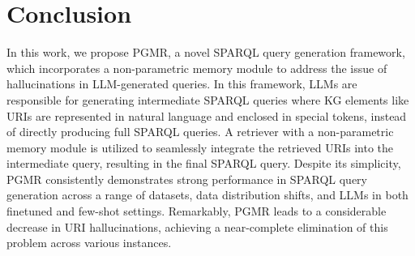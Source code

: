 \section{Conclusion}
\label{sec:conclusion}

In this work, we propose PGMR, a novel SPARQL query generation framework, which incorporates a non-parametric memory module to address the issue of hallucinations in LLM-generated queries.
In this framework, LLMs are responsible for generating intermediate SPARQL queries where KG elements like URIs are represented in natural language and enclosed in special tokens, instead of directly producing full SPARQL queries.
A retriever with a non-parametric memory module is utilized to seamlessly integrate the retrieved URIs into the intermediate query, resulting in the final SPARQL query.
Despite its simplicity, PGMR consistently demonstrates strong performance in SPARQL query generation across a range of datasets, data distribution shifts, and LLMs in both finetuned and few-shot settings.
Remarkably, PGMR leads to a considerable decrease in URI hallucinations, achieving a near-complete elimination of this problem across various instances.



